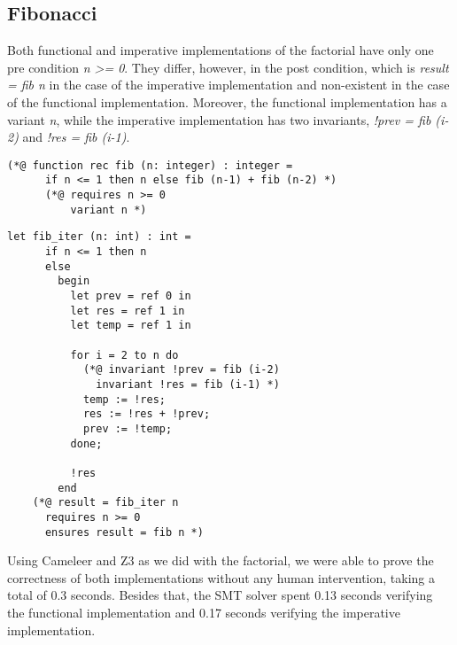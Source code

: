   \subsection{Fibonacci}
  \label{sub:fibonacci}

  Both functional and imperative implementations of the factorial have only one pre condition \emph{n >= 0}.
  They differ, however, in the post condition, which is \emph{result = fib n} in the case of the imperative implementation and non-existent in the case of the functional implementation.
  Moreover, the functional implementation has a variant \emph{n}, while the imperative implementation has two invariants, \emph{!prev = fib (i-2)} and \emph{!res = fib (i-1)}. 

  \begin{lstlisting}[language=caml, caption={Functional fibonacci implementation},captionpos=b]
    (*@ function rec fib (n: integer) : integer =
	  if n <= 1 then n else fib (n-1) + fib (n-2) *)
	  (*@ requires n >= 0 
		  variant n *)
  \end{lstlisting}


  \begin{lstlisting}[language=caml, caption={Imperative fibonacci implementation},captionpos=b]
    let fib_iter (n: int) : int =
      if n <= 1 then n
      else
        begin
          let prev = ref 0 in 
          let res = ref 1 in
          let temp = ref 1 in

          for i = 2 to n do
            (*@ invariant !prev = fib (i-2)
              invariant !res = fib (i-1) *)
            temp := !res;
            res := !res + !prev;
            prev := !temp;
          done;

          !res
        end
    (*@ result = fib_iter n
      requires n >= 0 
      ensures result = fib n *)
  \end{lstlisting}

  Using Cameleer and Z3 as we did with the factorial, we were able to prove the correctness of both implementations without any human intervention, taking a total of 0.3 seconds.
  Besides that, the SMT solver spent 0.13 seconds verifying the functional implementation and 0.17 seconds verifying the imperative implementation.

